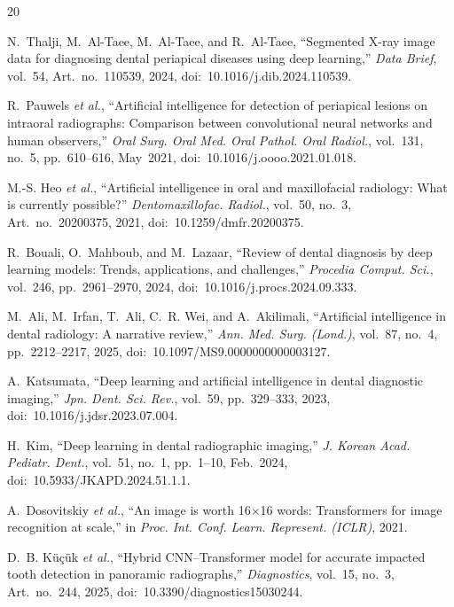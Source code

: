 \documentclass[conference]{IEEEtran}
\begin{document}


\begin{thebibliography}{20}

N.~Thalji, M.~Al-Taee, M.~Al-Taee, and R.~Al-Taee,
``Segmented X-ray image data for diagnosing dental periapical diseases using
deep learning,''
\textit{Data Brief}, vol.~54, Art.\ no.~110539, 2024,
doi:~10.1016/j.dib.2024.110539.

R.~Pauwels \textit{et al.},
``Artificial intelligence for detection of periapical lesions on intraoral
radiographs: Comparison between convolutional neural networks and human
observers,''
\textit{Oral Surg. Oral Med. Oral Pathol. Oral Radiol.}, vol.~131, no.~5,
pp.~610--616, May~2021,
doi:~10.1016/j.oooo.2021.01.018.

M.-S. Heo \textit{et al.},
``Artificial intelligence in oral and maxillofacial radiology: What is
currently possible?''
\textit{Dentomaxillofac. Radiol.}, vol.~50, no.~3, Art.\ no.~20200375, 2021,
doi:~10.1259/dmfr.20200375.

R.~Bouali, O.~Mahboub, and M.~Lazaar,
``Review of dental diagnosis by deep learning models: Trends, applications,
and challenges,''
\textit{Procedia Comput. Sci.}, vol.~246, pp.~2961--2970, 2024,
doi:~10.1016/j.procs.2024.09.333.

M.~Ali, M.~Irfan, T.~Ali, C.~R. Wei, and A.~Akilimali,
``Artificial intelligence in dental radiology: A narrative review,''
\textit{Ann. Med. Surg. (Lond.)}, vol.~87, no.~4, pp.~2212--2217, 2025,
doi:~10.1097/MS9.0000000000003127.

A.~Katsumata,
``Deep learning and artificial intelligence in dental diagnostic imaging,''
\textit{Jpn. Dent. Sci. Rev.}, vol.~59, pp.~329--333, 2023,
doi:~10.1016/j.jdsr.2023.07.004.

H.~Kim,
``Deep learning in dental radiographic imaging,''
\textit{J. Korean Acad. Pediatr. Dent.}, vol.~51, no.~1, pp.~1--10,
Feb.~2024,
doi:~10.5933/JKAPD.2024.51.1.1.

A.~Dosovitskiy \textit{et al.},
``An image is worth 16$\times$16 words: Transformers for image recognition
at scale,''
in \textit{Proc. Int. Conf. Learn. Represent. (ICLR)}, 2021.

D.~B. K\"{u}\c{c}\"{u}k \textit{et al.},
``Hybrid CNN--Transformer model for accurate impacted tooth detection in
panoramic radiographs,''
\textit{Diagnostics}, vol.~15, no.~3, Art.\ no.~244, 2025,
doi:~10.3390/diagnostics15030244.


\end{thebibliography}
\end{document}
